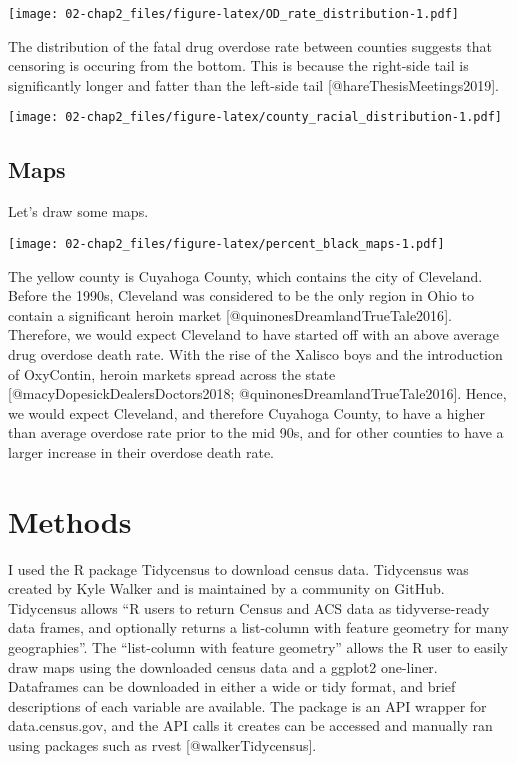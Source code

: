 \documentclass[
]{article}
\begin{document}
\texttt{[image: 02-chap2\_files/figure-latex/OD\_rate\_distribution-1.pdf]}

The distribution of the fatal drug overdose rate between counties
suggests that censoring is occuring from the bottom. This is because the
right-side tail is significantly longer and fatter than the left-side
tail {[}@hareThesisMeetings2019{]}.

\texttt{[image: 02-chap2\_files/figure-latex/county\_racial\_distribution-1.pdf]}

\hypertarget{maps}{%
\subsection{Maps}\label{maps}}

Let's draw some maps.

\texttt{[image: 02-chap2\_files/figure-latex/percent\_black\_maps-1.pdf]}

The yellow county is Cuyahoga County, which contains the city of
Cleveland. Before the 1990s, Cleveland was considered to be the only
region in Ohio to contain a significant heroin market
{[}@quinonesDreamlandTrueTale2016{]}. Therefore, we would expect
Cleveland to have started off with an above average drug overdose death
rate. With the rise of the Xalisco boys and the introduction of
OxyContin, heroin markets spread across the state
{[}@macyDopesickDealersDoctors2018; @quinonesDreamlandTrueTale2016{]}.
Hence, we would expect Cleveland, and therefore Cuyahoga County, to have
a higher than average overdose rate prior to the mid 90s, and for other
counties to have a larger increase in their overdose death rate.

\hypertarget{methods}{%
\section{Methods}\label{methods}}

I used the R package Tidycensus to download census data. Tidycensus was
created by Kyle Walker and is maintained by a community on GitHub.
Tidycensus allows ``R users to return Census and ACS data as
tidyverse-ready data frames, and optionally returns a list-column with
feature geometry for many geographies''. The ``list-column with feature
geometry'' allows the R user to easily draw maps using the downloaded
census data and a ggplot2 one-liner. Dataframes can be downloaded in
either a wide or tidy format, and brief descriptions of each variable
are available. The package is an API wrapper for data.census.gov, and
the API calls it creates can be accessed and manually ran using packages
such as rvest {[}@walkerTidycensus{]}.
\end{document}
